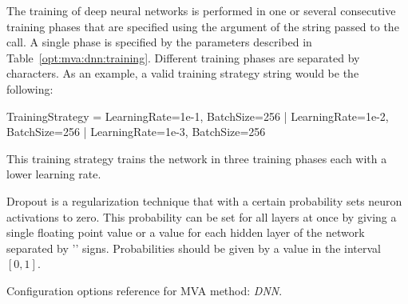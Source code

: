 The training of deep neural networks is performed in one or several
consecutive training phases that are specified using the
 argument of the  string passed
to the  call. A single phase is specified by the
parameters described in Table~\ref{opt:mva:dnn:training}. Different
training phases are separated by \code{|} characters.
 As an example, a valid training strategy string would be the following:

\begin{tmvacode}
  TrainingStrategy = LearningRate=1e-1, BatchSize=256
                   | LearningRate=1e-2, BatchSize=256
                   | LearningRate=1e-3, BatchSize=256
\end{tmvacode}

This training strategy trains the network in three training phases
each with a lower learning rate.

Dropout is a regularization technique that with a certain probability
sets neuron activations to zero. This probability can be set for all
layers at once by giving a single floating point value or a value for
each hidden layer of the network separated by '\code{+}'
signs. Probabilities should be given by a value in the interval
$[0,1]$.

\begin{option}[h]

\caption[.]{\optionCaptionSize 
     Configuration options reference for MVA method: {\em DNN}.
}
\label{opt:mva:dnn:training}
\end{option}

\clearpage


